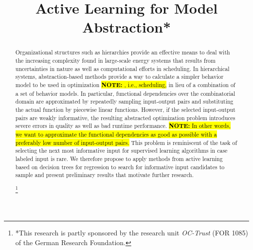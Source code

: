 \documentclass[conference]{IEEEtran}
\newcommand{\note}[1]{\sethlcolor{highlightblue} \hl{\textbf{NOTE:} #1}}
\newcommand\blfootnote[1]{%
  \begingroup
  \renewcommand\thefootnote{}\footnote{#1}%
  \addtocounter{footnote}{-1}%
  \endgroup
}
\begin{document}
\title{Active Learning for Model Abstraction*}

\author{
}

\maketitle

\begin{abstract}
Organizational structures such as hierarchies provide an effective means to
deal with the increasing complexity found in large-scale energy systems that 
results from uncertainties in nature as well as computational efforts in scheduling. 
In hierarchical systems, abstraction-based methods provide a way to calculate a simpler behavior model 
to be used in optimization\note{, i.e., scheduling,} in lieu of a combination of a set of behavior models.
In particular, functional dependencies over the combinatorial domain 
are approximated by repeatedly sampling input-output pairs
and substituting the actual function by piecewise linear functions. However, if
the selected input-output pairs are weakly informative, the resulting abstracted
optimization problem introduces severe errors in quality as well as bad runtime performance. \note{In other words, we want to approximate the functional dependencies as good as possible with a preferably low number of input-output pairs.}
This problem is reminiscent of the task of selecting the next most informative input for supervised learning
algorithms in case labeled input is rare.
We therefore propose to apply methods from active learning based on decision trees for regression
to search for informative
input candidates to sample and present preliminary results that motivate further research. 

\blfootnote{*This research is partly sponsored by the research unit \emph{OC-Trust} (FOR 1085) of the German Research Foundation.}
\end{abstract}
\end{document}
